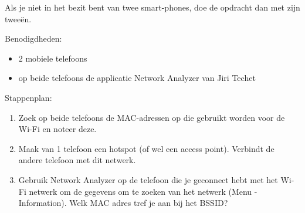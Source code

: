 Als je niet in het bezit bent van twee smart-phones, doe de opdracht dan met zijn twee\"en.

Benodigdheden:
\begin{itemize}
\item 2 mobiele telefoons
\item op beide telefoons de applicatie Network Analyzer van Jiri Techet
\end{itemize}

Stappenplan:
\begin{enumerate}
\item Zoek op beide telefoons de MAC-adressen op die gebruikt worden voor de Wi-Fi en noteer deze.
\item Maak van 1 telefoon een hotspot (of wel een access point). Verbindt de andere telefoon met dit netwerk.
\item Gebruik Network Analyzer op de telefoon die je geconnect hebt met het Wi-Fi netwerk om de gegevens om te zoeken van het netwerk (Menu - Information). Welk MAC adres tref je aan bij het BSSID?
\end{enumerate}
